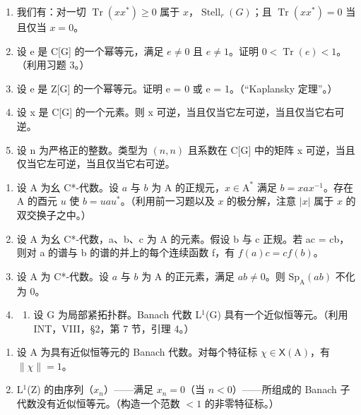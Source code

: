 \begin{enumerate}
\def\labelenumi{\alph{enumi})}
\setcounter{enumi}{4}
\item
  我们有：对一切 \(\operatorname{Tr}(xx^{*}) \geqslant 0\) 属于 \(x\)，\(\operatorname{Stell}_r(G)\)；且 \(\operatorname{Tr}(xx^{*}) = 0\) 当且仅当 \(x = 0\)。
\item
  设 e 是 C{[}G{]} 的一个幂等元，满足 \(e \neq 0\) 且 \(e \neq 1\)。证明 \(0 < \operatorname{Tr}(e) < 1\)。（利用习题 3。）
\item
  设 e 是 Z{[}G{]} 的一个幂等元。证明 e = 0 或 e = 1。（“Kaplansky 定理”。）
\item
  设 x 是 C{[}G{]} 的一个元素。则 x 可逆，当且仅当它左可逆，当且仅当它右可逆。
\item
  设 n 为严格正的整数。类型为 \((n, n)\) 且系数在 C{[}G{]} 中的矩阵 x 可逆，当且仅当它左可逆，当且仅当它右可逆。
\end{enumerate}

\begin{enumerate}
\def\labelenumi{\arabic{enumi})}
\setcounter{enumi}{25}
\item
  设 A 为幺 C*-代数。设 \(a\) 与 \(b\) 为 A 的正规元，\(x \in \mathrm{A}^*\) 满足 \(b = xax^{-1}\)。存在 A 的酉元 \(u\) 使 \(b = uau^*\)。（利用前一习题以及 \(x\) 的极分解，注意 \(|x|\) 属于 \(x\) 的双交换子之中。）
\item
  设 A 为幺 C*-代数，a、b、c 为 A 的元素。假设 b 与 c 正规。若 ac = cb，则对 a 的谱与 b 的谱的并上的每个连续函数 f，有 \(f(a)c = cf(b)\)。
\item
  设 A 为 C*-代数。设 \(a\) 与 \(b\) 为 A 的正元素，满足 \(ab \neq 0\)。则 \(\mathrm{Sp}_{\mathrm{A}}(ab)\) 不化为 0。
\item
  \begin{enumerate}
  \def\labelenumii{\alph{enumii})}
  \tightlist
  \item
  设 G 为局部紧拓扑群。Banach 代数 L\(^{1}\)(G) 具有一个近似恒等元。（利用 INT，VIII，§2，第 7 节，引理 4。）
  \end{enumerate}
\end{enumerate}

\begin{enumerate}
\def\labelenumi{\alph{enumi})}
\setcounter{enumi}{1}
\item
  设 A 为具有近似恒等元的 Banach 代数。对每个特征标 \(\chi\in\mathsf{X}(\mathrm{A})\)，有 \(\|\chi\|=1\)。
\item
  L\(^{1}\)(Z) 的由序列（\(x_{n}\)）——满足 \(x_{n} = 0\)（当 \(n < 0\)）——所组成的 Banach 子代数没有近似恒等元。（构造一个范数 \(< 1\) 的非零特征标。）
\end{enumerate}

